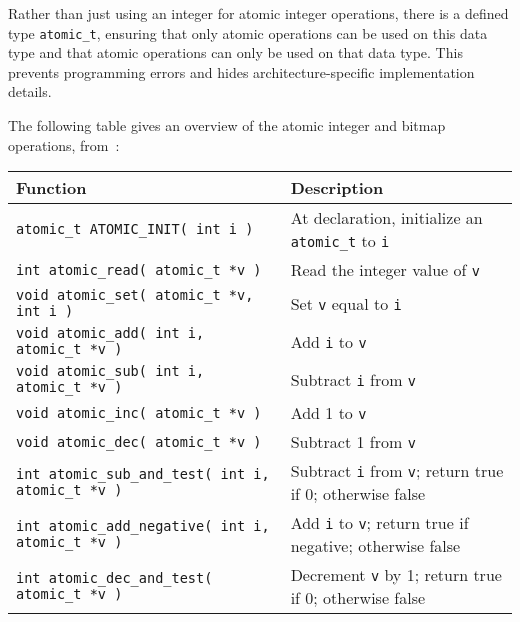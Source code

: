 Rather than just using an integer for atomic integer operations, there is a defined type \texttt{atomic\_t}, ensuring that only atomic operations can be used on this data type and that atomic operations can only be used on that data type. This prevents programming errors and hides architecture-specific implementation details.

The following table gives an overview of the atomic integer and bitmap operations, from~\cite{lkd}:

\begin{center}
\begin{tabular}{l|l}
	\textbf{Function} & \textbf{Description}\\\hline

	\texttt{atomic\_t ATOMIC\_INIT( int i )} & At declaration, initialize an \texttt{atomic\_t} to \texttt{i}\\\hline

\texttt{int atomic\_read( atomic\_t *v )} &  Read the integer value of \texttt{v}\\\hline

\texttt{void atomic\_set( atomic\_t *v, int i )} & Set \texttt{v} equal to \texttt{i}\\\hline

\texttt{void atomic\_add( int i, atomic\_t *v )} & Add \texttt{i} to \texttt{v}\\\hline

\texttt{void atomic\_sub( int i, atomic\_t *v )} & Subtract \texttt{i} from \texttt{v}\\\hline

\texttt{void atomic\_inc( atomic\_t *v )} & Add 1 to \texttt{v}\\\hline

\texttt{void atomic\_dec( atomic\_t *v )} & Subtract 1 from \texttt{v}\\\hline

\texttt{int atomic\_sub\_and\_test( int i, atomic\_t *v )} & Subtract \texttt{i} from \texttt{v}; return true if 0; otherwise false\\\hline

\texttt{int atomic\_add\_negative( int i, atomic\_t *v )} & Add \texttt{i} to \texttt{v}; return true if negative; otherwise false\\\hline

\texttt{int atomic\_dec\_and\_test( atomic\_t *v )} & Decrement \texttt{v} by 1; return true if 0; otherwise false\\\hline


\end{tabular}
\end{center}
